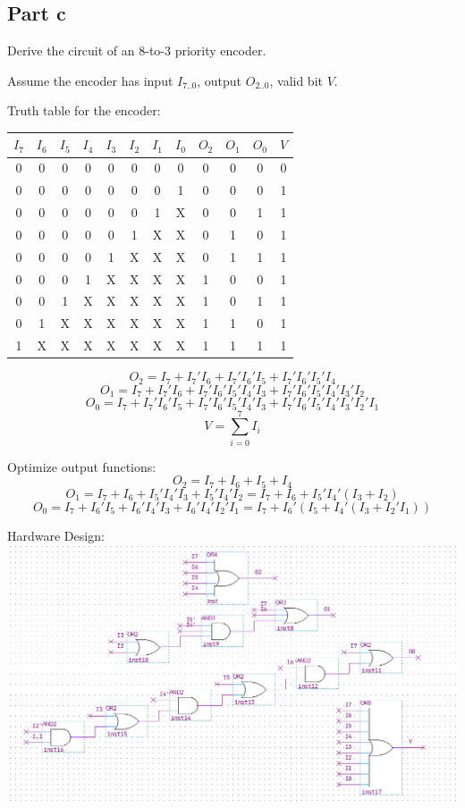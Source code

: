 \documentclass[12pt, a4paper]{article}
\begin{document}
	\subsection*{Part c}
	Derive the circuit of an 8-to-3 priority encoder.

	Assume the encoder has input $I_{7..0}$, output $O_{2..0}$, valid bit $V$.

	Truth table for the encoder:
	\begin{center}
		\begin{tabular}{| c | c | c | c | c | c | c | c || c | c | c || c |}
			\hline
			$I_7$ & $I_6$ & $I_5$ & $I_4$ & $I_3$ & $I_2$ & $I_1$ & $I_0$ & $O_2$ & $O_1$ & $O_0$ & $V$ \\
			\hline
			0 & 0 & 0 & 0 & 0 & 0 & 0 & 0 & 0 & 0 & 0 & 0 \\
			\hline
			0 & 0 & 0 & 0 & 0 & 0 & 0 & 1 & 0 & 0 & 0 & 1 \\
			\hline
			0 & 0 & 0 & 0 & 0 & 0 & 1 & X & 0 & 0 & 1 & 1 \\
			\hline
			0 & 0 & 0 & 0 & 0 & 1 & X & X & 0 & 1 & 0 & 1 \\
			\hline
			0 & 0 & 0 & 0 & 1 & X & X & X & 0 & 1 & 1 & 1 \\
			\hline
			0 & 0 & 0 & 1 & X & X & X & X & 1 & 0 & 0 & 1 \\
			\hline
			0 & 0 & 1 & X & X & X & X & X & 1 & 0 & 1 & 1 \\
			\hline
			0 & 1 & X & X & X & X & X & X & 1 & 1 & 0 & 1 \\
			\hline
			1 & X & X & X & X & X & X & X & 1 & 1 & 1 & 1 \\
			\hline
		\end{tabular}
	\end{center}
	$$O_2 = I_7 + I_7'I_6 + I_7'I_6'I_5 + I_7'I_6'I_5'I_4$$
	$$O_1 = I_7 + I_7'I_6 + I_7'I_6'I_5'I_4'I_3 + I_7'I_6'I_5'I_4'I_3'I_2$$
	$$O_0 = I_7 + I_7'I_6'I_5 + I_7'I_6'I_5'I_4'I_3 + I_7'I_6'I_5'I_4'I_3'I_2'I_1$$
	$$V = \sum_{i = 0}^{7}{I_i}$$

	Optimize output functions:
	$$O_2 = I_7 + I_6 + I_5 + I_4$$
	$$O_1 = I_7 + I_6 + I_5'I_4'I_3 + I_5'I_4'I_2 = I_7 + I_6 + I_5'I_4'(I_3 + I_2)$$
	$$O_0 = I_7 + I_6'I_5 + I_6'I_4'I_3 + I_6'I_4'I_2'I_1 = I_7 + I_6'(I_5 + I_4'(I_3 + I_2'I_1))$$
	
	Hardware Design:\\
	\includegraphics[scale=0.5]{3c.png}
\end{document}
